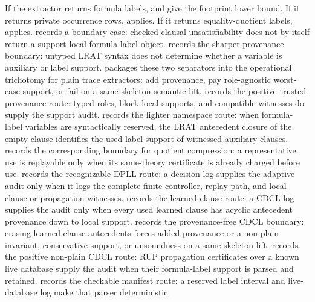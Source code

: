 \documentclass[11pt]{article}
\theoremstyle{definition}
\begin{document}
If the extractor returns formula labels,  and  give the footprint lower bound.  If it returns private occurrence rows,  applies.  If it returns equality-quotient labels,  applies.   records a boundary case: checked clausal unsatisfiability does not by itself return a support-local formula-label object.   records the sharper provenance boundary: untyped LRAT syntax does not determine whether a variable is auxiliary or label support.   packages these two separators into the operational trichotomy for plain trace extractors: add provenance, pay role-agnostic worst-case support, or fail on a same-skeleton semantic lift.   records the positive trusted-provenance route: typed roles, block-local supports, and compatible witnesses do supply the support audit.   records the lighter namespace route: when formula-label variables are syntactically reserved, the LRAT antecedent closure of the empty clause identifies the used label support of witnessed auxiliary clauses.   records the corresponding boundary for quotient compression: a representative use is replayable only when its same-theory certificate is already charged before use.   records the recognizable DPLL route: a decision log supplies the adaptive audit only when it logs the complete finite controller, replay path, and local clause or propagation witnesses.   records the learned-clause route: a CDCL log supplies the audit only when every used learned clause has acyclic antecedent provenance down to local support.   records the provenance-free CDCL boundary: erasing learned-clause antecedents forces added provenance or a non-plain invariant, conservative support, or unsoundness on a same-skeleton lift.   records the positive non-plain CDCL route: RUP propagation certificates over a known live database supply the audit when their formula-label support is parsed and retained.   records the checkable manifest route: a reserved label interval and live-database log make that parser deterministic.  
\end{document}
